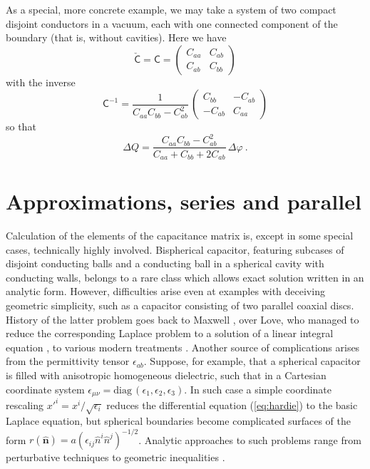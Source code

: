 \documentclass[12pt]{iopart}
\newcommand{\be}{\begin{equation}}
\newcommand{\ee}{\end{equation}}
\newcommand{\mx}[1]{\bm{\mathsf{#1}}}
\newcommand{\0}{\vct{0}}
\theoremstyle{plain} \newtheorem{tm}{Theorem}[section]
\theoremstyle{plain} \newtheorem{lm}[tm]{Lemma}
\theoremstyle{definition} \newtheorem{defn}[tm]{Definition}
\begin{document}
\medskip

As a special, more concrete example, we may take a system of two compact disjoint conductors in a vacuum, each with one connected component of the boundary (that is, without cavities). Here we have
\be
\mx{\check{C}} = \mx{C} = \begin{pmatrix} C_{aa} & C_{ab} \\ C_{ab} & C_{bb} \end{pmatrix}
\ee
with the inverse
\be
\mx{C}^{-1} = \frac{1}{C_{aa}C_{bb} - C_{ab}^2} \, \begin{pmatrix} C_{bb} & -C_{ab} \\ -C_{ab} & C_{aa} \end{pmatrix}
\ee
so that
\be
\Delta Q = \frac{C_{aa}C_{bb} - C_{ab}^2}{C_{aa} + C_{bb} + 2C_{ab}}\,\Delta\varphi \ .
\ee

\bigskip







\section{Approximations, series and parallel} %

Calculation of the elements of the capacitance matrix is, except in some special cases, technically highly involved. Bispherical capacitor, featuring subcases of disjoint conducting balls and a conducting ball in a spherical cavity with conducting walls, belongs to a rare class which allows exact solution written in an analytic form. However, difficulties arise even at examples with deceiving geometric simplicity, such as a capacitor consisting of two parallel coaxial discs. History of the latter problem goes back to Maxwell \cite{Maxwell}, over Love, who managed to reduce the corresponding Laplace problem to a solution of a linear integral equation \cite{Love49}, to various modern treatments \cite{Hutson63,Rao05,PCDiLM16,Paffuti17}. Another source of complications arises from the permittivity tensor $\epsilon_{ab}$. Suppose, for example, that a spherical capacitor is filled with anisotropic homogeneous dielectric, such that in a Cartesian coordinate system $\epsilon_{\mu\nu} = \mathrm{diag}\,(\epsilon_1,\epsilon_2,\epsilon_3)$. In such case a simple coordinate rescaling $x'^i = x^i/\sqrt{\epsilon_i}$ reduces the differential equation (\ref{eq:hardie}) to the basic Laplace equation, but spherical boundaries become complicated surfaces of the form $r(\mathbf{\hat{n}}) = a (\hat{\epsilon}_{ij} \hat{n}^i \hat{n}^j)^{-1/2}$. Analytic approaches to such problems range from perturbative techniques \cite{Erma63} to geometric inequalities \cite{PS}.
\end{document}
